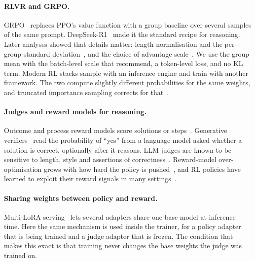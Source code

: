 \paragraph{RLVR and GRPO.} GRPO~\cite{shao2024deepseekmath} replaces PPO's value function with a group baseline over
several samples of the same prompt. DeepSeek-R1~\cite{deepseek2025r1} made it the standard recipe for reasoning. Later
analyses showed that details matter: length normalisation and the per-group standard
deviation~\cite{liu2025understanding}, and the choice of advantage scale~\cite{liu2026tricks}. We use the group mean with
the batch-level scale that \citet{liu2026tricks} recommend, a token-level loss, and no KL term. Modern RL stacks sample
with an inference engine and train with another framework. The two compute slightly different probabilities for the
same weights, and truncated importance sampling corrects for that~\cite{yao2025offpolicy}.

\paragraph{Judges and reward models for reasoning.} Outcome and process reward models score solutions or
steps~\cite{lightman2024verify,wang2024mathshepherd}. Generative verifiers~\cite{zhang2024genverifier} read the
probability of ``yes'' from a language model asked whether a solution is correct, optionally after it reasons. LLM
judges are known to be sensitive to length, style and assertions of correctness~\cite{zheng2023judging}. Reward-model
over-optimisation grows with how hard the policy is pushed~\cite{gao2023scaling}, and RL policies have learned to
exploit their reward signals in many settings~\cite{skalse2022defining,denison2024sycophancy,baker2025monitoring}.

\paragraph{Sharing weights between policy and reward.} Multi-LoRA serving~\cite{hu2022lora,kwon2023vllm} lets several
adapters share one base model at inference time. Here the same mechanism is used inside the trainer, for a policy
adapter that is being trained and a judge adapter that is frozen. The condition that makes this exact is that training
never changes the base weights the judge was trained on.
